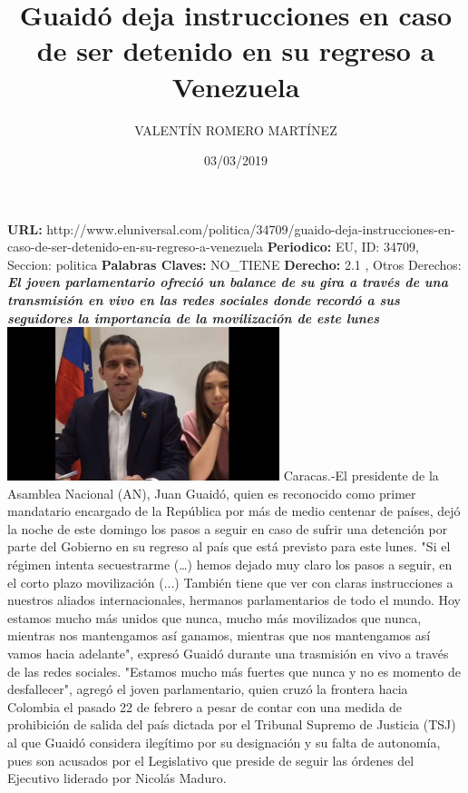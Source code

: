 \documentclass{article}%
\title{\textbf{Guaidó deja instrucciones en caso de ser detenido en su regreso a Venezuela}}%
\author{VALENTÍN ROMERO MARTÍNEZ}%
\date{03/03/2019}%
\begin{document}
%
\normalsize%
\maketitle%
\textbf{URL: }%
http://www.eluniversal.com/politica/34709/guaido{-}deja{-}instrucciones{-}en{-}caso{-}de{-}ser{-}detenido{-}en{-}su{-}regreso{-}a{-}venezuela\newline%
%
\textbf{Periodico: }%
EU, %
ID: %
34709, %
Seccion: %
politica\newline%
%
\textbf{Palabras Claves: }%
NO\_TIENE\newline%
%
\textbf{Derecho: }%
2.1%
, Otros Derechos: %
\newline%
%
\textbf{\textit{El joven parlamentario ofreció un balance de su gira a través de una transmisión en vivo en las redes sociales donde recordó a sus seguidores la importancia de la movilización de este lunes}}%
\newline%
\newline%
%
\includegraphics[width=300px]{EU_34709.jpg}%
\newline%
%
Caracas.{-}El presidente de la Asamblea Nacional (AN), Juan Guaidó, quien es reconocido como primer mandatario encargado de la República por más de medio centenar de países, dejó la noche de este domingo los pasos a seguir en caso de sufrir una detención por parte del Gobierno en su regreso al país que está previsto para este lunes.%
\newline%
%
"Si el régimen intenta secuestrarme (…) hemos dejado muy claro los pasos a seguir, en el corto plazo movilización (...) También tiene que ver con claras instrucciones a nuestros aliados internacionales, hermanos parlamentarios de todo el mundo. Hoy estamos mucho más unidos que nunca, mucho más movilizados que nunca, mientras nos mantengamos así ganamos, mientras que nos mantengamos así vamos hacia adelante", expresó Guaidó durante una trasmisión en vivo a través de las redes sociales.%
\newline%
%
"Estamos mucho más fuertes que nunca y no es momento de desfallecer", agregó el joven parlamentario, quien cruzó la frontera hacia Colombia el pasado 22 de febrero a pesar de contar con una medida de prohibición de salida del país dictada por el Tribunal Supremo de Justicia (TSJ) al que Guaidó considera ilegítimo por su designación y su falta de autonomía, pues son acusados por el Legislativo que preside de seguir las órdenes del Ejecutivo liderado por Nicolás Maduro.%
\end{document}
